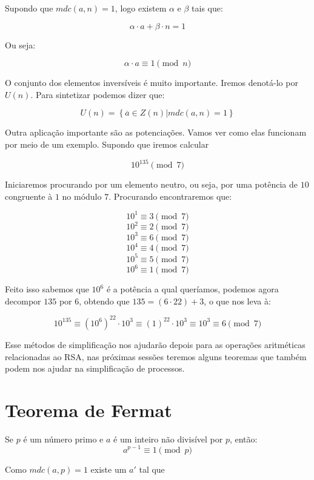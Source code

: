 Supondo que $mdc(a,n) = 1$, logo existem $\alpha$ e $\beta$ tais que:

$$\alpha \cdot a + \beta \cdot n = 1$$

Ou seja:

$$\alpha \cdot a \equiv 1 \pmod{n}$$
\hfill \newline

O conjunto dos elementos invers\'iveis \'e muito importante. Iremos denot\'a-lo por $U(n)$. Para sintetizar podemos dizer que:

$$U(n) = \left\{\overline{a} \in Z(n) | mdc(a,n) = 1\right\}$$

Outra aplica\c{c}\~ao importante s\~ao as potencia\c{c}\~oes. Vamos ver como elas funcionam por meio de um exemplo. Supondo que iremos calcular

$$10^{135} \pmod{7}$$

Iniciaremos procurando por um elemento neutro, ou seja, por uma pot\^encia de $10$ congruente \`a $1$ no m\'odulo $7$. Procurando encontraremos que:

  $$10^1 \equiv 3 \pmod{7}$$  
	$$10^2 \equiv 2 \pmod{7}$$
	$$10^3 \equiv 6 \pmod{7}$$ 
	$$10^4 \equiv 4 \pmod{7}$$ 
	$$10^5 \equiv 5 \pmod{7}$$ 
	$$10^6 \equiv 1 \pmod{7}$$ 
	
Feito isso sabemos que $10^6$ \'e a pot\^encia a qual quer\'iamos, podemos agora decompor $135$ por $6$, obtendo que $135 = (6 \cdot 22) + 3$, o que nos leva à:

$$10^{135} \equiv (10^6)^{22} \cdot 10^3 \equiv (1)^{22} \cdot 10^3 \equiv 10^3 \equiv 6 \pmod{7}$$

Esse m\'etodos de simplifica\c{c}\~ao nos ajudar\~ao depois para as opera\c{c}\~oes aritm\'eticas relacionadas ao RSA, nas pr\'oximas sess\~oes teremos alguns teoremas que tamb\'em podem nos ajudar na simplifica\c{c}\~ao de processos.

\section{Teorema de Fermat}

\begin{Th}\label{fermat}
Se $p$ \'e um n\'umero primo e $a$ \'e um inteiro n\~ao divis\'ivel por $p$, ent\~ao:
$$a^{p-1}\equiv 1 \pmod{p}$$
\end{Th}

\newline
Como $mdc(a,p)=1$ existe um $a'$ tal que

